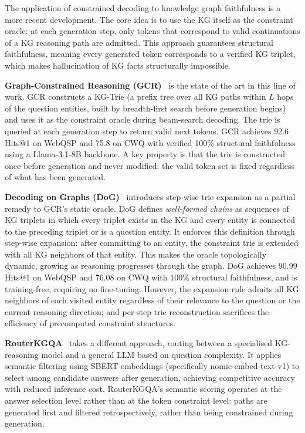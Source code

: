 The application of constrained decoding to knowledge graph faithfulness is a more recent development. The core idea is to use the KG itself as the constraint oracle: at each generation step, only tokens that correspond to valid continuations of a KG reasoning path are admitted. This approach guarantees structural faithfulness, meaning every generated token corresponds to a verified KG triplet, which makes hallucination of KG facts structurally impossible.

\textbf{Graph-Constrained Reasoning (GCR)}~\citep{luo2024gcr} is the state of the art in this line of work. GCR constructs a KG-Trie (a prefix tree over all KG paths within $L$ hops of the question entities, built by breadth-first search before generation begins) and uses it as the constraint oracle during beam-search decoding. The trie is queried at each generation step to return valid next tokens. GCR achieves 92.6 Hits@1 on WebQSP and 75.8 on CWQ with verified 100\% structural faithfulness using a Llama-3.1-8B backbone. A key property is that the trie is constructed once before generation and never modified: the valid token set is fixed regardless of what has been generated.

\textbf{Decoding on Graphs (DoG)}~\citep{li2024dog} introduces step-wise trie expansion as a partial remedy to GCR's static oracle. DoG defines \textit{well-formed chains} as sequences of KG triplets in which every triplet exists in the KG and every entity is connected to the preceding triplet or is a question entity. It enforces this definition through step-wise expansion: after committing to an entity, the constraint trie is extended with all KG neighbors of that entity. This makes the oracle topologically dynamic, growing as reasoning progresses through the graph. DoG achieves 90.99 Hits@1 on WebQSP and 76.08 on CWQ with 100\% structural faithfulness, and is training-free, requiring no fine-tuning. However, the expansion rule admits all KG neighbors of each visited entity regardless of their relevance to the question or the current reasoning direction; and per-step trie reconstruction sacrifices the efficiency of precomputed constraint structures.

\textbf{RouterKGQA}~\citep{yuan2026routerkgqa} takes a different approach, routing between a specialised KG-reasoning model and a general LLM based on question complexity. It applies semantic filtering using SBERT embeddings (specifically nomic-embed-text-v1) to select among candidate answers after generation, achieving competitive accuracy with reduced inference cost. RouterKGQA's semantic scoring operates at the answer selection level rather than at the token constraint level: paths are generated first and filtered retrospectively, rather than being constrained during generation.

